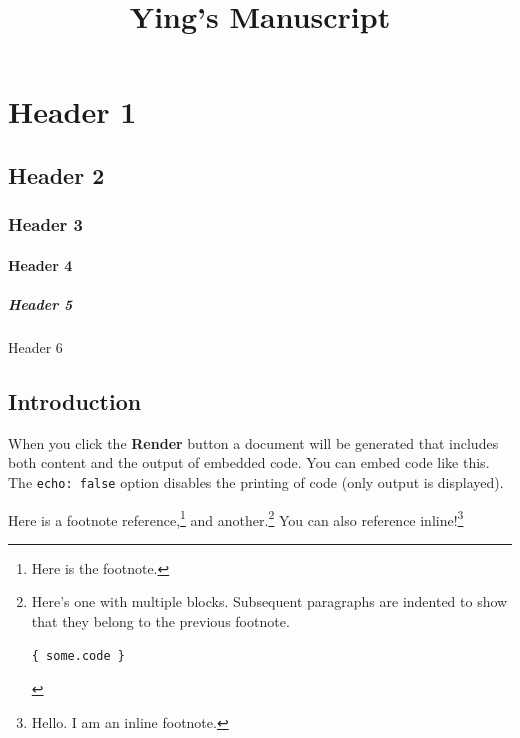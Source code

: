 \documentclass[
  9pt,
  letterpaper,
  DIV=11,
  numbers=noendperiod]{scrartcl}
\title{Ying's Manuscript}
\author{}
\date{}
\let\oldparagraph\paragraph
\renewcommand{\paragraph}[1]{\oldparagraph{#1}\mbox{}}
\let\oldsubparagraph\subparagraph
\renewcommand{\subparagraph}[1]{\oldsubparagraph{#1}\mbox{}}
\begin{document}
\maketitle
\ifdefined\Shaded\renewenvironment{Shaded}{\begin{tcolorbox}[boxrule=0pt, breakable, frame hidden, borderline west={3pt}{0pt}{shadecolor}, sharp corners, enhanced, interior hidden]}{\end{tcolorbox}}\fi

\hypertarget{header-1}{%
\section{Header 1}\label{header-1}}

\hypertarget{header-2}{%
\subsection{Header 2}\label{header-2}}

\hypertarget{header-3}{%
\subsubsection{Header 3}\label{header-3}}

\hypertarget{header-4}{%
\paragraph{Header 4}\label{header-4}}

\hypertarget{header-5}{%
\subparagraph{Header 5}\label{header-5}}

Header 6

\hypertarget{sec-introduction}{%
\subsection{Introduction}\label{sec-introduction}}

When you click the \textbf{Render} button a document will be generated
that includes both content and the output of embedded code. You can
embed code like this. The \texttt{echo:\ false} option disables the
printing of code (only output is displayed).

Here is a footnote reference,\footnote{Here is the footnote.} and
another.\footnote{Here's one with multiple blocks. Subsequent paragraphs
  are indented to show that they belong to the previous footnote.

\begin{Verbatim}
{ some.code }
\end{Verbatim}
} You can also reference inline!\footnote{Hello. I am an inline
  footnote.}
\end{document}
